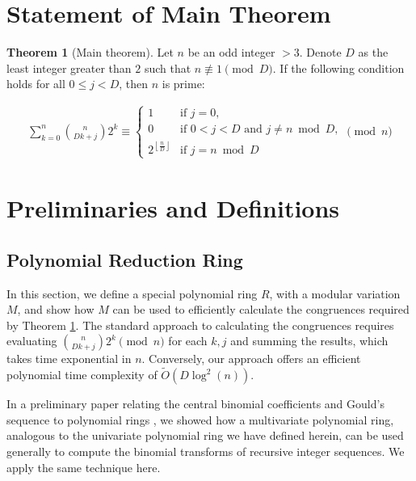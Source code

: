 \documentclass{article}
\theoremstyle{plain}
\theoremstyle{definition}
\newtheorem{theorem}{Theorem}
\newcommand{\floor}[1]{\left\lfloor #1 \right\rfloor}
\newcommand{\Rx}{R}
\newcommand{\Mx}{M}
\begin{document}
\section{Statement of Main Theorem}
\begin{theorem}[Main theorem]
\label{theorem:main}
Let $n$ be an odd integer $> 3$. Denote $D$ as the least integer greater than $2$ such that $n \not\equiv 1 \pmod{D}$. If the following condition holds for all $0 \leq j < D$, then $n$ is prime:

\begin{align}
    \sum_{k=0}^{n} \binom{n}{Dk + j} 2^k
    \equiv
    \begin{cases} 
        1 & \text{if } j=0, \\
        0 & \text{if } 0 < j < D \text{ and } j \neq n \bmod{D}, \\
        2^{\floor{\frac{n}{D}}} & \text{if } j = n \bmod{D}
    \end{cases}
    \pmod{n}
\end{align}
\end{theorem}

\section{Preliminaries and Definitions}

\subsection{Polynomial Reduction Ring} \label{section:polyrings}
In this section, we define a special polynomial ring $\Rx$, with a modular variation $\Mx$, and show how $\Mx$ can be used to efficiently calculate the congruences required by Theorem \ref{theorem:main}. The standard approach to calculating the congruences requires evaluating $\binom{n}{Dk+j} 2^k \pmod{n}$ for each $k,j$ and summing the results, which takes time exponential in $n$. Conversely, our approach offers an efficient polynomial time complexity of $\tilde{O}(D \log^2(n))$.

In a preliminary paper relating the central binomial coefficients and Gould's sequence to polynomial rings \cite{shunia2023polynomial}, we showed how a multivariate polynomial ring, analogous to the univariate polynomial ring we have defined herein, can be used generally to compute the binomial transforms of recursive integer sequences. We apply the same technique here.
\end{document}
